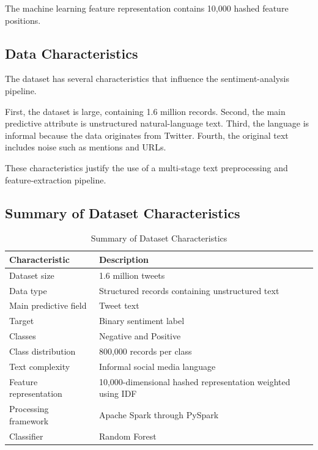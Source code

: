 \documentclass[12pt,a4paper]{article}
\begin{document}
The machine learning feature representation contains 10,000 hashed feature positions.



\subsection{Data Characteristics}

The dataset has several characteristics that influence the sentiment-analysis pipeline.

First, the dataset is large, containing 1.6 million records. Second, the main predictive attribute is unstructured natural-language text. Third, the language is informal because the data originates from Twitter. Fourth, the original text includes noise such as mentions and URLs.

These characteristics justify the use of a multi-stage text preprocessing and feature-extraction pipeline.

\subsection{Summary of Dataset Characteristics}

\begin{table}[H]
\centering
\caption{Summary of Dataset Characteristics}
\begin{tabular}{p{5cm}p{8cm}}
\toprule
\textbf{Characteristic} & \textbf{Description} \\
\midrule
Dataset size & 1.6 million tweets \\
Data type & Structured records containing unstructured text \\
Main predictive field & Tweet text \\
Target & Binary sentiment label \\
Classes & Negative and Positive \\
Class distribution & 800,000 records per class \\
Text complexity & Informal social media language \\
Feature representation & 10,000-dimensional hashed representation weighted using IDF \\
Processing framework & Apache Spark through PySpark \\
Classifier & Random Forest \\
\bottomrule
\end{tabular}
\end{table}


\newpage
\end{document}
